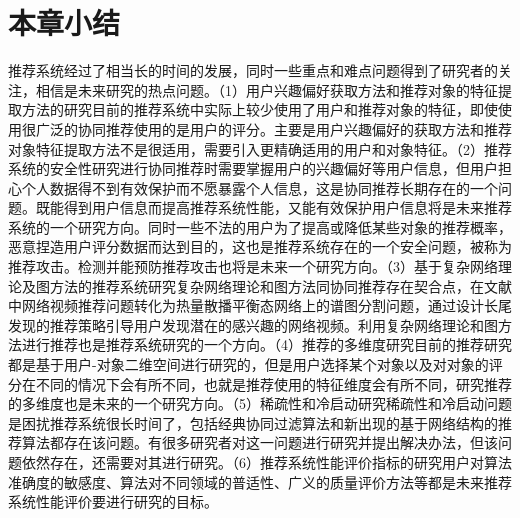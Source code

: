   \section{本章小结}
  推荐系统经过了相当长的时间的发展，同时一些重点和难点问题得到了研究者的关注，相信是未来研究的热点问题。（1）用户兴趣偏好获取方法和推荐对象的特征提取方法的研究目前的推荐系统中实际上较少使用了用户和推荐对象的特征，即使使用很广泛的协同推荐使用的是用户的评分。主要是用户兴趣偏好的获取方法和推荐对象特征提取方法不是很适用，需要引入更精确适用的用户和对象特征。（2）推荐系统的安全性研究进行协同推荐时需要掌握用户的兴趣偏好等用户信息，但用户担心个人数据得不到有效保护而不愿暴露个人信息，这是协同推荐长期存在的一个问题。既能得到用户信息而提高推荐系统性能，又能有效保护用户信息将是未来推荐系统的一个研究方向。同时一些不法的用户为了提高或降低某些对象的推荐概率，恶意捏造用户评分数据而达到目的，这也是推荐系统存在的一个安全问题，被称为推荐攻击。检测并能预防推荐攻击也将是未来一个研究方向。（3）基于复杂网络理论及图方法的推荐系统研究复杂网络理论和图方法同协同推荐存在契合点，在文献中网络视频推荐问题转化为热量散播平衡态网络上的谱图分割问题，通过设计长尾发现的推荐策略引导用户发现潜在的感兴趣的网络视频。利用复杂网络理论和图方法进行推荐也是推荐系统研究的一个方向。（4）推荐的多维度研究目前的推荐研究都是基于用户-对象二维空间进行研究的，但是用户选择某个对象以及对对象的评分在不同的情况下会有所不同，也就是推荐使用的特征维度会有所不同，研究推荐的多维度也是未来的一个研究方向。（5）稀疏性和冷启动研究稀疏性和冷启动问题是困扰推荐系统很长时间了，包括经典协同过滤算法和新出现的基于网络结构的推荐算法都存在该问题。有很多研究者对这一问题进行研究并提出解决办法，但该问题依然存在，还需要对其进行研究。（6）推荐系统性能评价指标的研究用户对算法准确度的敏感度、算法对不同领域的普适性、广义的质量评价方法等都是未来推荐系统性能评价要进行研究的目标。